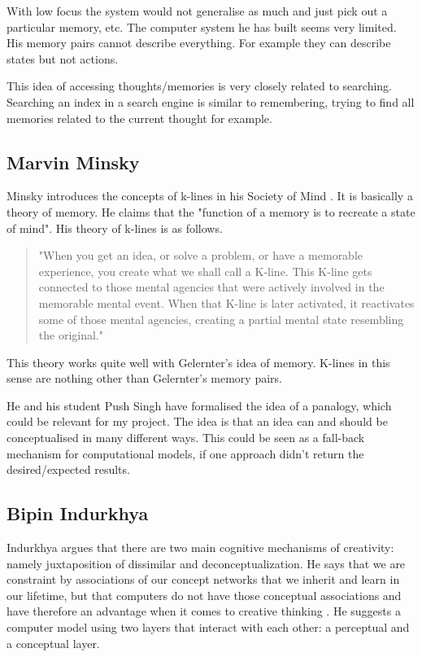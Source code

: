 With low focus the system would not generalise as much and just pick out a particular memory, etc. The computer system he has built seems very limited. His memory pairs cannot describe everything. For example they can describe states but not actions.

This idea of accessing thoughts/memories is very closely related to searching. Searching an index in a search engine is similar to remembering, trying to find all memories related to the current thought for example.

\subsection{Marvin Minsky}

Minsky introduces the concepts of k-lines in his Society of Mind \citep{Minsky1980, Minsky1988}. It is basically a theory of memory. He claims that the "function of a memory is to recreate a state of mind". His theory of k-lines is as follows.

\begin{quote}
  "When you get an idea, or solve a problem, or have a memorable experience, you create what we shall call a K-line. This K-line gets connected to those mental agencies that were actively involved in the memorable mental event. When that K-line is later activated, it reactivates some of those mental agencies, creating a partial mental state resembling the original."\citep{Minsky1980, Minsky1988}
\end{quote}

This theory works quite well with Gelernter's idea of memory. K-lines in this sense are nothing other than Gelernter's memory pairs.

He and his student Push Singh have formalised the idea of a panalogy, which could be relevant for my project. The idea is that an idea can and should be conceptualised in many different ways. This could be seen as a fall-back mechanism for computational models, if one approach didn't return the desired/expected results.

\subsection{Bipin Indurkhya}

Indurkhya argues that there are two main cognitive mechanisms of creativity: namely juxtaposition of dissimilar and deconceptualization. He says that we are constraint by associations of our concept networks that we inherit and learn in our lifetime, but that computers do not have those conceptual associations and have therefore an advantage when it comes to creative thinking \citep{Indurkhya}. He suggests a computer model using two layers that interact with each other: a perceptual and a conceptual layer.

